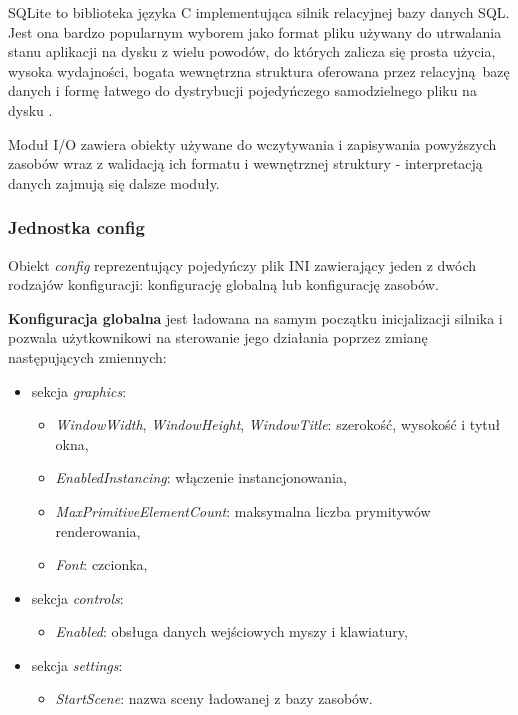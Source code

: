 SQLite \cite{SQLITE} to biblioteka języka C implementująca silnik relacyjnej bazy danych SQL.
Jest ona bardzo popularnym wyborem jako format pliku używany do utrwalania stanu aplikacji na dysku z wielu powodów, do których zalicza się prosta użycia, wysoka wydajności, bogata wewnętrzna struktura oferowana przez relacyjną bazę danych i formę łatwego do dystrybucji pojedyńczego samodzielnego pliku na dysku \cite{SQLITEAPPFORMAT}.

Moduł I/O zawiera obiekty używane do wczytywania i zapisywania powyższych zasobów wraz z walidacją ich formatu i wewnętrznej struktury - interpretacją danych zajmują się dalsze moduły.

\subsubsection{Jednostka config}
Obiekt \textit{config} reprezentujący pojedyńczy plik INI zawierający jeden z dwóch rodzajów konfiguracji: konfigurację globalną lub konfigurację zasobów.

\textbf{Konfiguracja globalna} jest ładowana na samym początku inicjalizacji silnika i pozwala użytkownikowi na sterowanie jego działania poprzez zmianę następujących zmiennych:
\begin{itemize}
	\item sekcja \textit{graphics}:
	\begin{itemize}
		\item \textit{WindowWidth}, \textit{WindowHeight}, \textit{WindowTitle}: szerokość, wysokość i tytuł okna,
		\item \textit{EnabledInstancing}: włączenie instancjonowania,
		\item \textit{MaxPrimitiveElementCount}: maksymalna liczba prymitywów renderowania,
		\item \textit{Font}: czcionka,
	\end{itemize}
	\item sekcja \textit{controls}:
	\begin{itemize}
		\item \textit{Enabled}: obsługa danych wejściowych myszy i klawiatury,
	\end{itemize}
	\item sekcja \textit{settings}:
	\begin{itemize}
		\item \textit{StartScene}: nazwa sceny ładowanej z bazy zasobów.
	\end{itemize}
\end{itemize}

